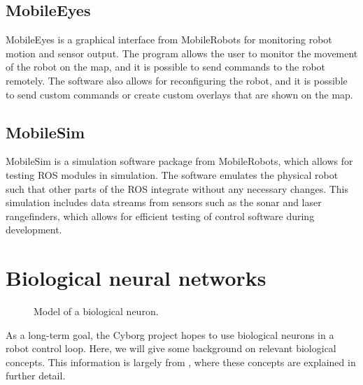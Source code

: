 \documentclass[\rootfolder/main.tex]{subfiles}
\begin{document}
\subsection{MobileEyes}

MobileEyes is a graphical interface from MobileRobots for monitoring robot motion and sensor output.
The program allows the user to monitor the movement of the robot on the map, and it is possible to send commands to the robot remotely.
The software also allows for reconfiguring the robot, and it is possible to send custom commands or create custom overlays that are shown on the map.


\subsection{MobileSim}

MobileSim is a simulation software package from MobileRobots, which allows for testing ROS modules in simulation.
The software emulates the physical robot such that other parts of the ROS integrate without any necessary changes.
This simulation includes data streams from sensors such as the sonar and laser rangefinders, which allows for efficient testing of control software during development.


\section{Biological neural networks}

\begin{figure}
    \caption{Model of a biological neuron.\label{fig:biological_neuron}}
\end{figure}


As a long-term goal, the Cyborg project hopes to use biological neurons in a robot control loop.
Here, we will give some background on relevant biological concepts.
This information is largely from \cite{Knudsen2016}, where these concepts are explained in further detail.
\end{document}

